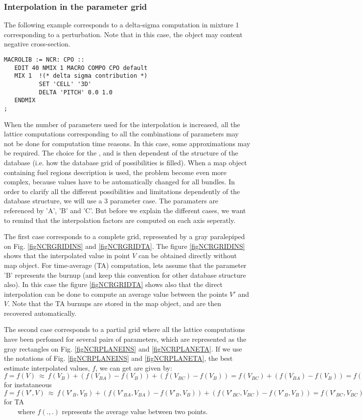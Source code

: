 \subsubsection{Interpolation in the parameter grid}


The following example corresponds to a delta-sigma computation in mixture 1 corresponding to a perturbation. Note that in this case, the  object  may content negative cross-section. 
\begin{verbatim}
MACROLIB := NCR: CPO ::
   EDIT 40 NMIX 1 MACRO COMPO CPO default
   MIX 1  !(* delta sigma contribution *)
          SET 'CELL' '3D'
          DELTA 'PITCH' 0.0 1.0
   ENDMIX
;
\end{verbatim}

When the number of parameters used for the interpolation is increased, all the lattice computations corresponding to all the combinations of parameters may not be done for computation time reasons. In this case, some approximations may be required. The choice for the ,  and  is then dependent of the structure of the database (i.e. how the database grid of possibilities is filled). When a {\sc map} object containing fuel regions description is used, the problem become even more complex, because values have to be automatically changed for all bundles. In order to clarify all the different possibilities and limitations dependently of the database structure, we will use a 3 parameter case. The paramaters are referenced by 'A', 'B' and 'C'. But before we explain the different cases, we want to remind that the interpolation factors are computed on each axis seperatly.

The first case corresponds to a complete grid, represented by a gray paralepiped on Fig. \ref{figNCRGRIDINS} and \ref{figNCRGRIDTA}. The
figure \ref{figNCRGRIDINS} shows that the interpolated value in point $V$ can be obtained directly without {\sc map} object. For time-average (TA) computation, lets assume that the parameter 'B' represents the burnup (and keep this convention for other database structure also). In this case the figure \ref{figNCRGRIDTA} shows also that the direct interpolation can be done to compute an average value between the points $V'$ and $V$. Note that the TA burnups are stored in the {\sc map} object, and are then recovered automatically.

The second case corresponds to a partial grid where all the lattice computations have been perfomed for several pairs of parameters, which are represented as the gray rectangles on Fig. \ref{figNCRPLANEINS} and \ref{figNCRPLANETA}. If we use the notations of Fig. \ref{figNCRPLANEINS} and \ref{figNCRPLANETA}, the best estimate interpolated values, $f$, we can get are given by: \\
$f=f(V)~\approx~f(V_B)+(f(V_{BA})-f(V_B))+(f(V_{BC})-f(V_B))=f(V_{BC})+(f(V_{BA})-f(V_B))=f(V_{BA})+(f(V_{BC})-f(V_B))$ for instataneous\\
$f=f(V',V)~\approx~f(V'_B,V_B)+(f(V'_{BA},V_{BA})-f(V'_B,V_B))+(f(V'_{BC},V_{BC})-f(V'_B,V_B))=f(V'_{BC},V_{BC})+(f(V'_{BA},V_{BA})-f(V'_B,V_B))=f(V'_{BA},V_{BA})+(f(V'_{BC},V_{BC})-f(V'_B,V_B))$ for TA\\
~~~~where $f(.,.)$ represents the average value between two points.


